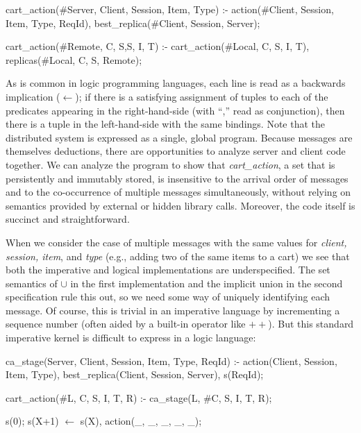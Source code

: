 \begin{Dedalus}
cart\_action(#Server, Client, Session, Item, Type) :-
  action(#Client, Session, Item, Type, ReqId),
  best_replica(#Client, Session, Server);

cart\_action(#Remote, C, S,S, I, T) :-
  cart\_action(#Local, C, S, I, T),
  replicas(#Local, C, S, Remote);
\end{Dedalus}

As is common in logic programming languages, each line is read as a backwards
implication ($\leftarrow$); if there is a satisfying assignment of tuples to each of
the predicates appearing in the right-hand-side (with ``,'' read as conjunction), 
then there is a tuple in the left-hand-side with the same bindings.
Note that the distributed system is expressed as a single, global program.
Because messages are themselves deductions, there are opportunities to 
analyze server and client code together.  We can analyze the program to 
show that {\em cart\_action}, a set that is persistently and immutably
stored, is insensitive to the arrival order of messages 
and to the co-occurrence of multiple messages simultaneously, without relying
on semantics provided by external or hidden library calls.   Moreover, the code 
itself is succinct and straightforward. 




When we consider the case of multiple messages with the same values for
{\em client, session, item}, and {\em type} (e.g., adding two of the same items to a cart)
we see that both the imperative and logical implementations are underspecified.
The set semantics of $\cup$ in the first implementation and the implicit union 
in the second specification rule this out, so we need some way of uniquely identifying each message.
Of course, this is trivial in an imperative language by incrementing a sequence number (often aided by a built-in operator like $++$).
But this standard imperative kernel is difficult to express in a logic language:

\begin{Dedalus}
ca_stage(Server, Client, Session, Item, Type, ReqId) :-
  action(Client, Session, Item, Type),
  best_replica(Client, Session, Server),
  s(ReqId);

cart_action(#L, C, S, I, T, R) :-
  ca_stage(L, #C, S, I, T, R);

s(0);
s(X+1) \(\leftarrow\)  s(X), action(_, _, _, _, _);
\end{Dedalus}


